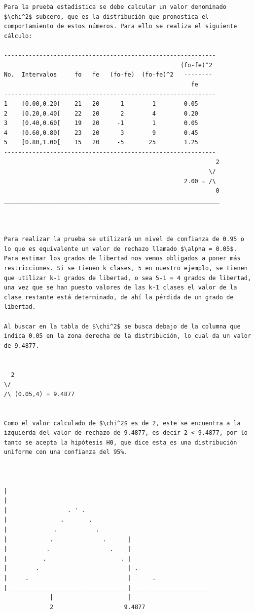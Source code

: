 \begin{verbatim}
Para la prueba estadística se debe calcular un valor denominado $\chi^2$ subcero, que es la distribución que pronostica el comportamiento de estos números. Para ello se realiza el siguiente cálculo:

------------------------------------------------------------
                                                  (fo-fe)^2
No.  Intervalos     fo   fe   (fo-fe)  (fo-fe)^2   --------
                                                     fe
------------------------------------------------------------
1    [0.00,0.20[    21   20      1        1        0.05
2    [0.20,0.40[    22   20      2        4        0.20
3    [0.40,0.60[    19   20     -1        1        0.05
4    [0.60,0.80[    23   20      3        9        0.45
5    [0.80,1.00[    15   20     -5       25        1.25
------------------------------------------------------------
                                                            2
                                                          \/
                                                   2.00 = /\
                                                            0
_____________________________________________________________



Para realizar la prueba se utilizará un nivel de confianza de 0.95 o lo que es equivalente un valor de rechazo llamado $\alpha = 0.05$. Para estimar los grados de libertad nos vemos obligados a poner más restricciones. Si se tienen k clases, 5 en nuestro ejemplo, se tienen que utilizar k-1 grados de libertad, o sea 5-1 = 4 grados de libertad, una vez que se han puesto valores de las k-1 clases el valor de la clase restante está determinado, de ahí la pérdida de un grado de libertad.

Al buscar en la tabla de $\chi^2$ se busca debajo de la columna que indica 0.05 en la zona derecha de la distribución, lo cual da un valor de 9.4877.


  2
\/
/\ (0.05,4) = 9.4877
  

Como el valor calculado de $\chi^2$ es de 2, este se encuentra a la izquierda del valor de rechazo de 9.4877, es decir 2 < 9.4877, por lo tanto se acepta la hipótesis H0, que dice esta es una distribución uniforme con una confianza del 95%.



|
|
|                 . ' .
|               .       .
|             .           .
|            .              .      |
|           .                 .    |
|          .                     . |
|        .                         | .
|     .                            |      .
|__________________________________|______________________
             |                     |  
             2                    9.4877





\end{verbatim}
